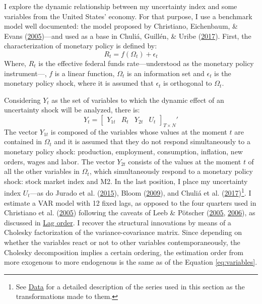 \documentclass[12pt,twoside]{reedthesis}
\begin{document}
I explore the dynamic relationship between my uncertainty index and some variables from the United States' economy. For that purpose, I use a benchmark model well documented: the model proposed by Christiano, Eichenbaum, \& Evans (\protect\hyperlink{ref-chrietal:2005}{2005})---and used as a base in Chuliá, Guillén, \& Uribe (\protect\hyperlink{ref-chuletal:2017}{2017}). First, the characterization of monetary policy is defined by:
\begin{equation}
    R_{t} = f(\Omega_{t}) + \epsilon_{t} \label{eq:R}
\end{equation}
Where, \(R_ {t}\) is the effective federal funds rate---understood as the monetary policy instrument---, \(f\) is a linear function, \(\Omega_{t}\) is an information set and \(\epsilon_{t}\) is the monetary policy shock, where it is assumed that \(\epsilon_{t}\) is orthogonal to \(\Omega_{t}\).

Considering \(Y_{t}\) as the set of variables to which the dynamic effect of an uncertainty shock will be analyzed, there is:
\begin{equation}
    Y_{t} = 
    \begin{bmatrix}
      Y_{1t} & R_{t} & Y_{2t} & U_{t} \label{eq:variables}
    \end{bmatrix}_{T \times N}'
\end{equation}
The vector \(Y_{1t}\) is composed of the variables whose values at the moment \(t\) are contained in \(\Omega_{t}\) and it is assumed that they do not respond simultaneously to a monetary policy shock: production, employment, consumption, inflation, new orders, wages and labor. The vector \(Y_{2t}\) consists of the values at the moment \(t\) of all the other variables in \(\Omega_{t}\), which simultaneously respond to a monetary policy shock: stock market index and M2. In the last position, I place my uncertainty index \(U_{t}\)---as do Jurado et al. (\protect\hyperlink{ref-juraetal:2015}{2015}), Bloom (\protect\hyperlink{ref-bloom:2009}{2009}), and Chuliá et al. (\protect\hyperlink{ref-chuletal:2017}{2017})\footnote{See \protect\hyperlink{data}{Data} for a detailed description of the series used in this section as the transformations made to them.}. I estimate a VAR model with 12 fixed lags, as opposed to the four quarters used in Christiano et al. (\protect\hyperlink{ref-chrietal:2005}{2005}) following the caveats of Leeb \& Pötscher (\protect\hyperlink{ref-leebpots:2005}{2005}, \protect\hyperlink{ref-leebpots:2006}{2006}), as discussed in \protect\hyperlink{lag-order}{Lag order}. I recover the structural innovations by means of a Cholesky factorization of the variance-covariance matrix. Since depending on whether the variables react or not to other variables contemporaneously, the Cholesky decomposition implies a certain ordering, the estimation order from more exogenous to more endogenous is the same as of the Equation \eqref{eq:variables}.
\end{document}
